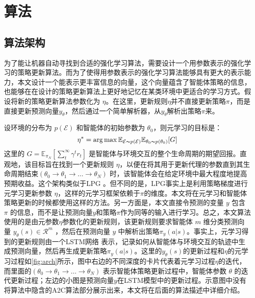 \chapter{算法}
\label{cha:usage-example}

\section{算法架构}

为了能让机器自动寻找到合适的强化学习算法，需要设计一个用参数表示的强化学习的策略更新算法。而为了使得用参数表示的强化学习算法能够具有更大的表示能力，本文设计一个能表示更丰富信息的向量，这个向量蕴含了智能体策略的信息，也能够在在设计的策略更新算法上更好地记忆在某类环境中更适合的学习方式。假设将新的策略更新算法参数化为 $\eta$。在这里，更新规则$\eta$并不直接更新策略$\pi$，而是直接更新预测向量$y_\theta$，然后通过一个简单解析器，从$y_\theta$解析出策略$\pi$来。

设环境的分布为 $p(\mathcal{E})$ 和智能体的初始参数为 $\theta_0$，则元学习的目标是：
\begin{equation}
    \eta^* = \arg \max \mathbb{E}_{\mathcal{E} \thicksim p(\mathcal{E})} \mathbb{E}_{\theta_0 \thicksim p(\theta_0)} [G]
    \label{eq:target}
\end{equation}
这里的 $G=\mathbb{E}_{\pi_N } [\sum_t^\infty \gamma^t r_t]$ 是智能体与环境交互的整个生命周期的期望回报。直观地，该目标旨在找到一个更新规则 $\eta$，以便在将其用于更新代理的参数直到其生命周期结束$ (\theta_0 \rightarrow \theta_1 \rightarrow \dots \rightarrow \theta_N)$ 时，该智能体会在给定环境中最大程度地提高预期收益。这个架构类似于LPG \cite{ohDiscoveringReinforcementLearning2020}。但不同的是，LPG事实上是利用策略梯度进行元学习更新参数 $\eta$，这样的元学习框架依赖于$\pi$的维度。本文将在元学习和智能体策略更新的时候都使用这样的方法。另一方面是，本文直接令预测的变量 $y$ 包含 $\pi$ 的信息，而不是让预测向量$y$和策略$\pi$作为同等的输入进行学习。总之，本文算法使用的是由元参数$\eta$参数化的更新规则，该更新规则要求智能体 $m$ 维分类预测向量 $y_\theta(s) \in \mathcal{R}^m$ ，然后在预测向量 $y$ 中解析出策略$\pi_y(a|s)$。事实上，元学习得到的更新规则由一个LSTM网络 \cite{sakLongShortTermMemory2014} 表示，记录如何从智能体与环境交互的轨迹中生成预测向量，然后再生成更新策略$\pi_{y}(a|s)$。这里的$y_\theta(s)$的更新过程和$\eta$的元学习过程如\autoref{fig:arch}所示，图中右边的不同深度的卡片代表着元学习过程$\eta$的迭代，而里面的$ (\theta_0 \rightarrow \theta_1 \rightarrow \dots \rightarrow \theta_N)$ 表示智能体策略更新过程中，智能体参数 $\theta$ 的迭代更新过程；左边的小图是预测向量$y$在LSTM模型中的更新过程。示意图中没有将算法中隐含的A2C算法部分展示出来，本文将在后面的算法描述中详细介绍。

